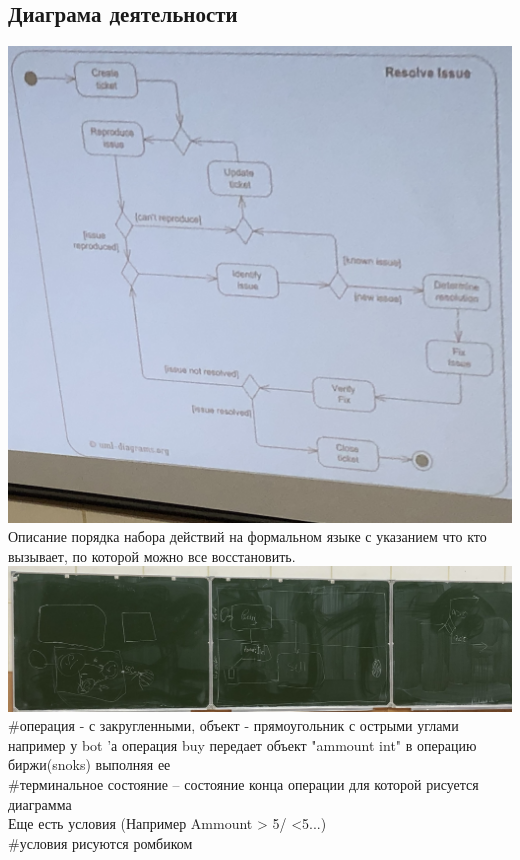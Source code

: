 \documentclass[12pt; a4paper]{book}
\begin{document}
\subsection{Диаграма деятельности}
\includegraphics[angle=0, width=\textwidth]{IMG/IMG_0821.jpg} \\
Описание порядка набора действий на формальном языке с указанием что кто вызывает, по которой можно все восстановить. \\
\includegraphics[angle=0, width=\textwidth]{IMG/IMG_0823.jpg} \\

\#операция - с закругленными, объект - прямоугольник с острыми углами \\
например у bot 'а операция buy передает объект "ammount int" в операцию биржи(snoks) выполняя ее\\
\#терминальное состояние -- состояние конца операции для которой рисуется диаграмма \\
Еще есть условия (Например Ammount > 5/ <5...) \\
\#условия рисуются ромбиком\\\
\end{document}
